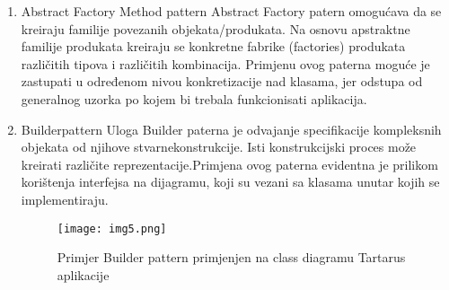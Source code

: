 \documentclass[12pt, a4paper]{report}
\theoremstyle{definition}
\begin{document}
\begin{enumerate}
\begin{figure}[h]
\end{figure}
    \item \large Abstract Factory Method pattern \newline
  \normalsize
  Abstract Factory patern omogućava da se kreiraju familije povezanih objekata/produkata. Na osnovu  apstraktne  familije produkata  kreiraju  se  konkretne  fabrike  (factories)  produkata različitih  tipova  i  različitih  kombinacija. Primjenu ovog  paterna  moguće je  zastupati  u određenom nivou konkretizacije nad klasama, jer odstupa od generalnog uzorka po kojem bi trebala funkcionisati aplikacija.
     \item \large Builderpattern \newline
  \normalsize
  Uloga  Builder  paterna  je  odvajanje  specifikacije  kompleksnih  objekata  od  njihove  stvarnekonstrukcije. Isti konstrukcijski proces može kreirati različite reprezentacije.Primjena  ovog paterna evidentna je prilikom korištenja  interfejsa  na  dijagramu,  koji  su  vezani  sa  klasama unutar kojih se implementiraju.
   \begin{figure}[h]
\centering
\texttt{[image: img5.png]}
\caption{Primjer Builder pattern primjenjen na class diagramu Tartarus aplikacije}
\end{figure}
  \end{enumerate}
\end{document}
